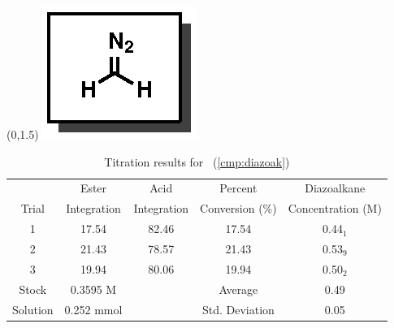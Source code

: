 \begin{singlespace}
\begin{table}[htbp]
\begin{textblock}{1}(0,1.5)
\includegraphics[scale=0.8]{chp_asymmetric/images/diazoak}
\end{textblock}
\flushright
{\small
\begin{tabular}{ccccc} 
\toprule
&Ester&Acid&Percent&Diazoalkane\\
Trial&Integration&Integration&Conversion (\%)&Concentration (M) \\ 
\midrule
1 & 17.54 & 82.46 & 17.54 & 0.44$_1$ \\
2 & 21.43 & 78.57 & 21.43 & 0.53$_9$ \\
3 & 19.94 & 80.06 & 19.94 & 0.50$_2$ \\
\midrule
Stock & 0.3595 M & & Average & 0.49 \\
Solution & 0.252 mmol & & Std. Deviation & 0.05 \\
\bottomrule
\end{tabular}
\caption{Titration results for \CMPdiazoak~(\ref{cmp:diazoak})}
}
\end{table}
\end{singlespace}

